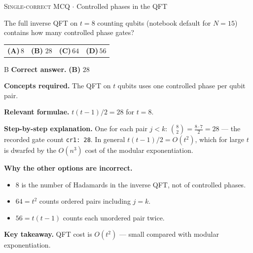 \documentclass[11pt,a4paper]{article}
\newcommand{\optlabel}[1]{\textbf{(#1)}}
\newcommand{\correctlabel}[1]{\textcolor{okgreen}{\textbf{(#1)}\,\ding{51}}}
\newenvironment{qitem}[1]{\begin{list}{}{\setlength{\leftmargin}{3.3em}\setlength{\labelwidth}{3.1em}%
  \setlength{\labelsep}{0.2em}\setlength{\topsep}{3pt}\setlength{\parsep}{3pt}}\item[\textbf{Q.#1}\hfill]}{\end{list}}
\newcommand{\qsep}{\par\vspace{2pt}{\color{black!15}\hrule}\vspace{4pt}}
\newcommand{\qmeta}[2]{{\footnotesize\color{black!60}\textsc{#1} \;$\cdot$\; #2}\par}
\begin{document}
\begin{qitem}{66}
\qmeta{Single-correct MCQ}{Controlled phases in the QFT}
The full inverse QFT on $t = 8$ counting qubits (notebook default for $N = 15$) contains how many controlled phase gates?
\par\smallskip\noindent\begin{tabularx}{\linewidth}{@{}*{4}{L}@{}}
\optlabel{A}\,$8$ & \correctlabel{B}\,$28$ & \optlabel{C}\,$64$ & \optlabel{D}\,$56$
\end{tabularx}
\end{qitem}
\begin{solbox}{B}
\textbf{\color{brand}Correct answer.} \textcolor{okgreen}{\textbf{(B)}} $28$

\textbf{\color{brand}Concepts required.} The QFT on $t$ qubits uses one controlled phase per qubit pair.

\textbf{\color{brand}Relevant formulae.} $t(t - 1)/2 = 28$ for $t = 8$.

\textbf{\color{brand}Step-by-step explanation.} One for each pair $j < k$: $\binom82 = \frac{8\cdot7}{2} = 28$ --- the recorded gate count \texttt{cr1: 28}. In general $t(t - 1)/2 = O(t^2)$, which for
large $t$ is dwarfed by the $O(n^3)$ cost of the modular exponentiation.

\textbf{\color{brand}Why the other options are incorrect.}
\begin{itemize}[leftmargin=2.4em, itemsep=1pt, topsep=2pt]
\item[\textbf{(A)}] $8$ is the number of Hadamards in the inverse QFT, not of controlled phases.
\item[\textbf{(C)}] $64 = t^2$ counts ordered pairs including $j = k$.
\item[\textbf{(D)}] $56 = t(t - 1)$ counts each unordered pair twice.
\end{itemize}
\textbf{\color{brand}Key takeaway.} QFT cost is $O(t^2)$ --- small compared with modular exponentiation.
\end{solbox}
\qsep
\end{document}
